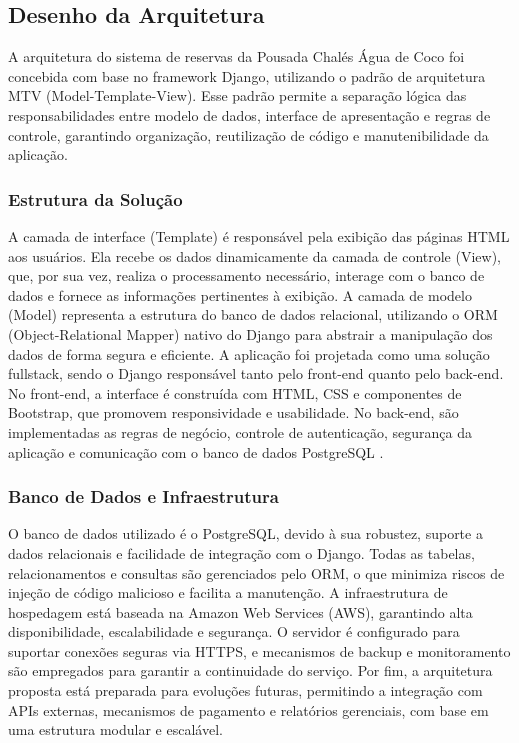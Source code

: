 \documentclass[
	12pt,				%
	openany,			%
	twoside,			%
	a4paper,			%
	english,			%
	french,				%
	spanish,			%
	brazil				%
	]{abntex2}
\begin{document}
\subsection{Desenho da Arquitetura}
A arquitetura do sistema de reservas da Pousada Chalés Água de Coco foi concebida com base no framework Django, utilizando o padrão de arquitetura MTV (Model-Template-View). Esse padrão permite a separação lógica das responsabilidades entre modelo de dados, interface de apresentação e regras de controle, garantindo organização, reutilização de código e manutenibilidade da aplicação.

\subsubsection{Estrutura da Solução}

A camada de interface (Template) é responsável pela exibição das páginas HTML aos usuários. Ela recebe os dados dinamicamente da camada de controle (View), que, por sua vez, realiza o processamento necessário, interage com o banco de dados e fornece as informações pertinentes à exibição. A camada de modelo (Model) representa a estrutura do banco de dados relacional, utilizando o ORM (Object-Relational Mapper) nativo do Django para abstrair a manipulação dos dados de forma segura e eficiente.
A aplicação foi projetada como uma solução fullstack, sendo o Django responsável tanto pelo front-end quanto pelo back-end. No front-end, a interface é construída com HTML, CSS e componentes de Bootstrap, que promovem responsividade e usabilidade. No back-end, são implementadas as regras de negócio, controle de autenticação, segurança da aplicação e comunicação com o banco de dados PostgreSQL
.
\subsubsection{Banco de Dados e Infraestrutura}

O banco de dados utilizado é o PostgreSQL, devido à sua robustez, suporte a dados relacionais e facilidade de integração com o Django. Todas as tabelas, relacionamentos e consultas são gerenciados pelo ORM, o que minimiza riscos de injeção de código malicioso e facilita a manutenção.
A infraestrutura de hospedagem está baseada na Amazon Web Services (AWS), garantindo alta disponibilidade, escalabilidade e segurança. O servidor é configurado para suportar conexões seguras via HTTPS, e mecanismos de backup e monitoramento são empregados para garantir a continuidade do serviço.
Por fim, a arquitetura proposta está preparada para evoluções futuras, permitindo a integração com APIs externas, mecanismos de pagamento e relatórios gerenciais, com base em uma estrutura modular e escalável.
\end{document}
